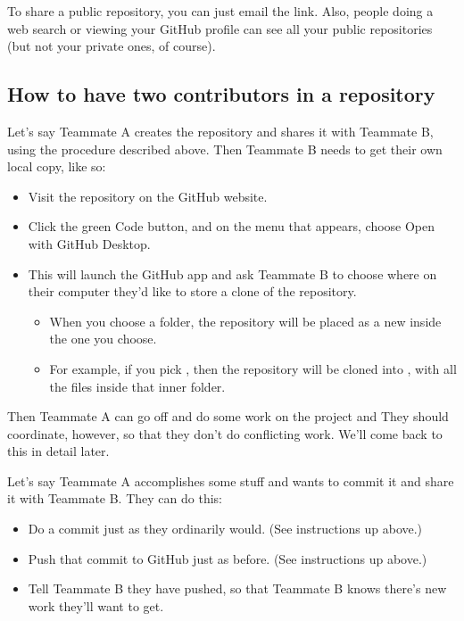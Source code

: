 \documentclass[letterpaper,10pt,english]{sphinxmanual}
\begin{document}
To share a public repository, you can just email the link.  Also, people doing a web search or viewing your GitHub profile can see all your public repositories (but not your private ones, of course).


\subsection{How to have two contributors in a repository}
\label{\detokenize{chapter-8-version-control:how-to-have-two-contributors-in-a-repository}}
Let’s say Teammate A creates the repository and shares it with Teammate B, using the procedure described above.  Then Teammate B needs to get their own local copy, like so:
\begin{itemize}
\item {} 
Visit the repository on the GitHub website.

\item {} 
Click the green Code button, and on the menu that appears, choose Open with GitHub Desktop.

\item {} 
This will launch the GitHub app and ask Teammate B to choose where on their computer they’d like to store a clone of the repository.
\begin{itemize}
\item {} 
When you choose a folder, the repository will be placed as a new  inside the one you choose.

\item {} 
For example, if you pick , then the repository will be cloned into , with all the files inside that inner folder.

\end{itemize}

\end{itemize}

Then Teammate A can go off and do some work on the project and   They should coordinate, however, so that they don’t do conflicting work.  We’ll come back to this in detail later.

Let’s say Teammate A accomplishes some stuff and wants to commit it and share it with Teammate B.  They can do this:
\begin{itemize}
\item {} 
Do a commit just as they ordinarily would.  (See instructions up above.)

\item {} 
Push that commit to GitHub just as before.  (See instructions up above.)

\item {} 
Tell Teammate B they have pushed, so that Teammate B knows there’s new work they’ll want to get.

\end{itemize}
\end{document}
